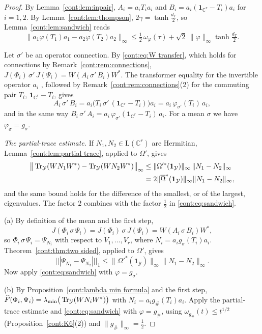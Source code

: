 \begin{proof}
By Lemma~\ref{cont:lem:inpair}, $A_i=a_iT_ia_i$ and $B_i=a_i(\mathbf{1}_{\mathbb{C}^r}-T_i)a_i$ for $i=1,2$. By Lemma~\ref{cont:lem:thompson}, $2\gamma=\tanh\frac{d_T}{2}$, so Lemma~\ref{cont:lem:sandwich} reads
\begin{equation}\label{cont:eq:sandwich}
\big\|a_1\varphi(T_1)a_1-a_2\varphi(T_2)a_2\big\|_\infty\leq\tfrac12\,\omega_\varphi(\tau)+\sqrt2\,\|\varphi\|_\infty\tanh\tfrac{d_T}{2}.
\end{equation}

 Let $\sigma'$ be an operator connection. By \eqref{cont:eq:W transfer}, which holds for connections by Remark~\ref{cont:rem:connections}, $J(\Phi_i)\,\sigma'\,J(\Psi_i)=W(A_i\,\sigma'\,B_i)W^*$. The transformer equality for the invertible operator $a_i$ \cite{KuboAndo1980}, followed by Remark~\ref{cont:rem:connections}(2) for the commuting pair $T_i$, $\mathbf{1}_{\mathbb{C}^r}-T_i$, gives
\[
A_i\,\sigma'\,B_i=a_i\big(T_i\,\sigma'\,(\mathbf{1}_{\mathbb{C}^r}-T_i)\big)a_i=a_i\,\varphi_{\sigma'}(T_i)\,a_i,
\]
and in the same way $B_i\,\sigma'\,A_i=a_i\,\varphi_{\sigma'}(\mathbf{1}_{\mathbb{C}^r}-T_i)\,a_i$. For a mean $\sigma$ we have $\varphi_\sigma=g_\sigma$.

\emph{The partial-trace estimate.} If $N_1,N_2\in\mathrm{L}(\mathbb{C}^r)$ are Hermitian, Lemma~\ref{cont:lem:partial trace}, applied to $\Omega'$, gives
\begin{align*}
\big\|\operatorname{Tr}_{\mathcal{Y}}(WN_1W^*)-\operatorname{Tr}_{\mathcal{Y}}(WN_2W^*)\big\|_\infty&\leq\|\Omega'^*(\mathbf{1}_{\mathcal{Y}})\|_\infty\,\|N_1-N_2\|_\infty\\
&=2\|\overline{\Omega}^*(\mathbf{1}_{\mathcal{Y}})\|_\infty\|N_1-N_2\|_\infty,
\end{align*}
and the same bound holds for the difference of the smallest, or of the largest, eigenvalues. The factor $2$ combines with the factor $\frac12$ in \eqref{cont:eq:sandwich}.

(a) By definition of the mean and the first step,
\[
J(\Phi_i\,\sigma\,\Psi_i)=J(\Phi_i)\,\sigma\,J(\Psi_i)=W(A_i\,\sigma\,B_i)W^*,
\]
so $\Phi_i\,\sigma\,\Psi_i=\Psi_{N_i}$ with respect to $V_1,\dots,V_r$, where $N_i=a_ig_\sigma(T_i)a_i$. Theorem~\ref{cont:thm:two sided}, applied to $\Omega'$, gives
\[
|||\Psi_{N_1}-\Psi_{N_2}|||_1\leq\|\Omega'^*(\mathbf{1}_{\mathcal{Y}})\|_\infty\|N_1-N_2\|_\infty.
\]
Now apply \eqref{cont:eq:sandwich} with $\varphi=g_\sigma$.

(b) By Proposition~\ref{cont:lambda min formula} and the first step, $\widehat{F}(\Phi_i,\Psi_i)=\lambda_{\min}\big(\operatorname{Tr}_{\mathcal{Y}}(WN_iW^*)\big)$ with $N_i=a_ig_\#(T_i)a_i$. Apply the partial-trace estimate and \eqref{cont:eq:sandwich} with $\varphi=g_\#$, using $\omega_{g_\#}(t)\leq t^{1/2}$ (Proposition~\ref{cont:K6}(2)) and $\|g_\#\|_\infty=\frac12$.


\end{proof}
